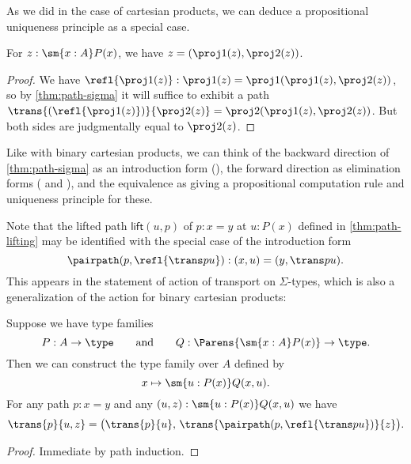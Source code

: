 As we did in the case of cartesian products, we can deduce a propositional uniqueness principle as a special case.

\begin{cor}\label{thm:eta-sigma}
  For $z:\sm{x:A} P(x)$, we have $z = (\proj1(z),\proj2(z))$.
\end{cor}
\begin{proof}
  We have $\refl{\proj1(z)} : \proj1(z) = \proj1(\proj1(z),\proj2(z))$, so by \cref{thm:path-sigma} it will suffice to exhibit a path $\trans{(\refl{\proj1(z)})}{\proj2(z)} = \proj2(\proj1(z),\proj2(z))$.
  But both sides are judgmentally equal to $\proj2(z)$.
\end{proof}

Like with binary cartesian products, we can think of
the backward direction of \cref{thm:path-sigma} as
an introduction form (\pairpath{}{}), the forward direction as
elimination forms ( and ), and the equivalence
as giving a propositional computation rule and uniqueness principle for these.

Note that the lifted path $\mathsf{lift}(u,p)$  of $p:x=y$ at $u:P(x)$ defined in \cref{thm:path-lifting} may be identified with the special case of the introduction form
\[\pairpath(p,\refl{\trans p u}):(x,u) = (y,\trans p u).\]
%
This appears in the statement of action of transport on $\Sigma$-types, which is also a generalization of the action for binary cartesian products:

\begin{thm}\label{transport-Sigma}
  Suppose we have type families
  \begin{equation*}
    P:A\to\type
    \qquad\text{and}\qquad
    Q:\Parens{\sm{x:A} P(x)}\to\type.
  \end{equation*}
  Then we can construct the type family over $A$ defined by
  \begin{equation*}
    x \mapsto \sm{u:P(x)} Q(x,u).
  \end{equation*}
  For any path $p:x=y$ and any $(u,z):\sm{u:P(x)} Q(x,u)$ we have
  \begin{equation*}
    \trans{p}{u,z}=\big(\trans{p}{u},\,\trans{\pairpath(p,\refl{\trans pu})}{z}\big).
  \end{equation*}
\end{thm}

\begin{proof}
Immediate by path induction.
\end{proof}

